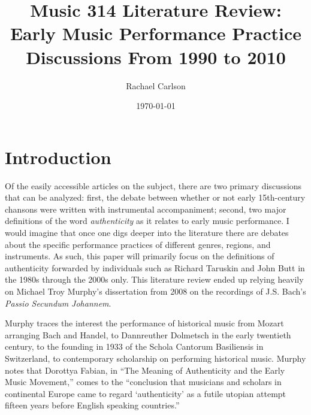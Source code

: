\documentclass[12pt]{article}
\author{Rachael Carlson}
\title{Music 314 Literature Review: Early Music Performance Practice Discussions From 1990 to 2010}
\date{\today}
\begin{document}
\begin{titlepage}
  \maketitle
\end{titlepage}

\section{Introduction}
\label{sec:introduction}
Of the easily accessible articles on the subject, there are two
primary discussions that can be analyzed: first, the debate between
whether or not early 15th-century chansons were written with
instrumental accompaniment; second, two major definitions of the word
\emph{authenticity} as it relates to early music performance. I would
imagine that once one digs deeper into the literature there are
debates about the specific performance practices of different genres,
regions, and instruments. As such, this paper will primarily focus on
the definitions of authenticity forwarded by individuals such as
Richard Taruskin and John Butt in the 1980s through the 2000s
only. This literature review ended up relying heavily on Michael Troy
Murphy's dissertation from 2008 on the recordings of J.S. Bach's
\emph{Passio Secundum Johannem}.\autocite{murphy2008}

Murphy traces the interest the performance of historical music from
Mozart arranging Bach and Handel, to Dannreuther Dolmetsch in the
early twentieth century, to the founding in 1933 of the Schola
Cantorum Basiliensis in Switzerland, to contemporary scholarship on
performing historical music.\autocite[9--16]{murphy2008} Murphy notes
that Dorottya Fabian, in ``The Meaning of Authenticity and the Early
Music Movement,'' comes to the ``conclusion that musicians and
scholars in continental Europe came to regard `authenticity' as a
futile utopian attempt fifteen years before English speaking
countries.''\autocite[23]{murphy2008}


\end{document}
